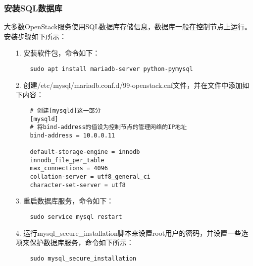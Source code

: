 \documentclass[a4paper,left=2.5cm,right=2.5cm,11pt]{article}
\begin{document}
\subsubsection{安装SQL数据库}
	大多数OpenStack服务使用SQL数据库存储信息，数据库一般在控制节点上运行。
	安装步骤如下所示：
	\begin{itemize}
		\item[1.] 安装软件包，命令如下：
		\begin{lstlisting}
	sudo apt install mariadb-server python-pymysql
		\end{lstlisting}

		\item[2.] 创建/etc/mysql/mariadb.conf.d/99-openstack.cnf文件，并在文件中添加如下内容：
		\begin{lstlisting}
	# 创建[mysqld]这一部分
	[mysqld]
	# 将bind-address的值设为控制节点的管理网络的IP地址
	bind-address = 10.0.0.11

	default-storage-engine = innodb
	innodb_file_per_table
	max_connections = 4096
	collation-server = utf8_general_ci
	character-set-server = utf8
		\end{lstlisting}

		\item[3.] 重启数据库服务，命令如下：
		\begin{lstlisting}
	sudo service mysql restart
		\end{lstlisting}


		\item[4.] 运行mysql\_secure\_installation脚本来设置root用户的密码，并设置一些选项来保护数据库服务，命令如下所示：
		\begin{lstlisting}
	sudo mysql_secure_installation
		\end{lstlisting}
	\end{itemize}
\end{document}
